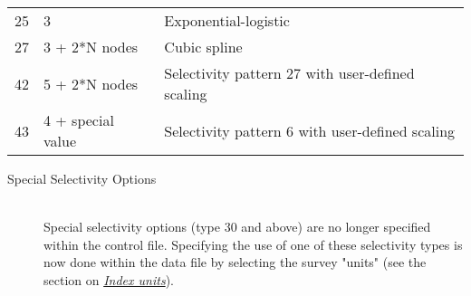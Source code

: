 \begin{center}
\begin{longtable}{p{2cm} p{3cm} p{10cm}}
		25 & 3 & Exponential-logistic \\
		27 & 3 + 2*N nodes & Cubic spline \\
		42 & 5 + 2*N nodes & Selectivity pattern 27 with user-defined scaling \\
		43 & 4 + special value & Selectivity pattern 6 with user-defined scaling \\
		\hline
	\end{longtable}
\end{center}


\begin{description}
	\item[Special Selectivity Options]\hfil\\
	Special selectivity options (type 30 and above) are no longer specified within the control file. Specifying the use of one of these selectivity types is now done within the data file by selecting the survey "units" (see the section on \hyperlink{IndexUnits}{\textit{Index units}}).	
\end{description}




